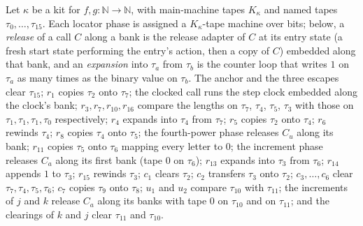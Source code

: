\begin{definition}
\label{Turing.NTimeDiag.qyLocM}
\leanok
{}
Let $\kappa$ be a kit for $f, g : \mathbb{N} \to \mathbb{N}$, with main-machine tapes
$K_\kappa$ and named tapes $\tau_0, \dots, \tau_{15}$. Each locator phase is assigned a
$K_\kappa$-tape machine over bits; below, a \emph{release} of a call $C$ along a bank is the
release adapter of $C$ at its entry state (a fresh start state performing the entry's action, then
a copy of $C$) embedded along that bank, and an \emph{expansion} into $\tau_a$ from $\tau_b$ is the
counter loop that writes $1$ on $\tau_a$ as many times as the binary value on $\tau_b$. The
anchor and the three escapes clear $\tau_{15}$; $r_1$ copies $\tau_2$ onto $\tau_7$; the clocked
call runs the step clock embedded along the clock's bank; $r_3, r_7, r_{10}, r_{16}$ compare the
lengths on $\tau_7$, $\tau_4$, $\tau_5$, $\tau_3$ with those on $\tau_1, \tau_1, \tau_1, \tau_0$
respectively; $r_4$ expands into $\tau_4$ from $\tau_7$; $r_5$ copies $\tau_2$ onto $\tau_4$; $r_6$
rewinds $\tau_4$; $r_8$ copies $\tau_4$ onto $\tau_5$; the fourth-power phase releases $C_u$ along
its bank; $r_{11}$ copies $\tau_5$ onto $\tau_6$ mapping every letter to $0$; the increment phase
releases $C_a$ along its first bank (tape $0$ on $\tau_6$); $r_{13}$ expands into $\tau_3$ from
$\tau_6$; $r_{14}$ appends $1$ to $\tau_3$; $r_{15}$ rewinds $\tau_3$; $c_1$ clears $\tau_2$;
$c_2$ transfers $\tau_3$ onto $\tau_2$; $c_3, \dots, c_6$ clear $\tau_7, \tau_4, \tau_5, \tau_6$;
$c_7$ copies $\tau_9$ onto $\tau_8$; $u_1$ and $u_2$ compare $\tau_{10}$ with $\tau_{11}$; the
increments of $j$ and $k$ release $C_a$ along its banks with tape $0$ on $\tau_{10}$ and on
$\tau_{11}$; and the clearings of $k$ and $j$ clear $\tau_{11}$ and $\tau_{10}$.
\end{definition}


